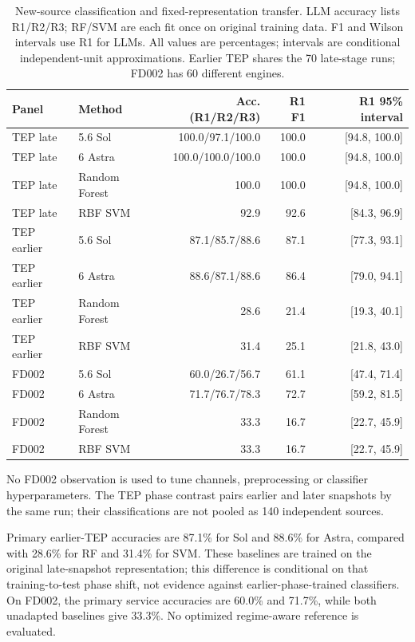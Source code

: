 \documentclass[11pt,a4paper]{article}
\begin{document}
\begin{table}[htbp]
\centering
\small
\caption{New-source classification and fixed-representation transfer. LLM accuracy lists R1/R2/R3; RF/SVM are each fit once on original training data. F1 and Wilson intervals use R1 for LLMs. All values are percentages; intervals are conditional independent-unit approximations. Earlier TEP shares the 70 late-stage runs; FD002 has 60 different engines.}
\label{tab:ind_transfer}
\begin{tabular}{@{}llrrr@{}}
\toprule
Panel & Method & Acc. (R1/R2/R3) & R1 F1 & R1 95\% interval \\
\midrule
TEP late & 5.6 Sol & 100.0/97.1/100.0 & 100.0 & [94.8, 100.0] \\
TEP late & 6 Astra & 100.0/100.0/100.0 & 100.0 & [94.8, 100.0] \\
TEP late & Random Forest & 100.0 & 100.0 & [94.8, 100.0] \\
TEP late & RBF SVM & 92.9 & 92.6 & [84.3, 96.9] \\
TEP earlier & 5.6 Sol & 87.1/85.7/88.6 & 87.1 & [77.3, 93.1] \\
TEP earlier & 6 Astra & 88.6/87.1/88.6 & 86.4 & [79.0, 94.1] \\
TEP earlier & Random Forest & 28.6 & 21.4 & [19.3, 40.1] \\
TEP earlier & RBF SVM & 31.4 & 25.1 & [21.8, 43.0] \\
FD002 & 5.6 Sol & 60.0/26.7/56.7 & 61.1 & [47.4, 71.4] \\
FD002 & 6 Astra & 71.7/76.7/78.3 & 72.7 & [59.2, 81.5] \\
FD002 & Random Forest & 33.3 & 16.7 & [22.7, 45.9] \\
FD002 & RBF SVM & 33.3 & 16.7 & [22.7, 45.9] \\
\bottomrule
\end{tabular}
\end{table}
No FD002 observation is used to tune channels, preprocessing or classifier hyperparameters. The TEP phase contrast pairs earlier and later snapshots by the same run; their classifications are not pooled as 140 independent sources.

Primary earlier-TEP accuracies are 87.1\% for Sol and 88.6\% for Astra, compared with 28.6\% for RF and 31.4\% for SVM. These baselines are trained on the original late-snapshot representation; this difference is conditional on that training-to-test phase shift, not evidence against earlier-phase-trained classifiers. On FD002, the primary service accuracies are 60.0\% and 71.7\%, while both unadapted baselines give 33.3\%. No optimized regime-aware reference is evaluated.
\end{document}
